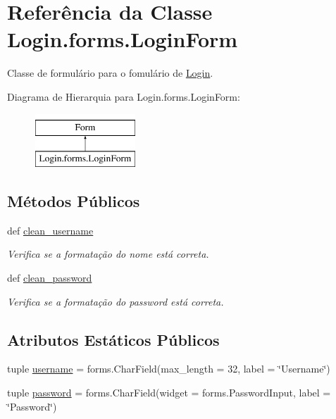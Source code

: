 \hypertarget{classLogin_1_1forms_1_1LoginForm}{\section{Referência da Classe Login.\-forms.\-Login\-Form}
\label{classLogin_1_1forms_1_1LoginForm}
}


Classe de formulário para o fomulário de \hyperlink{namespaceLogin}{Login}.  


Diagrama de Hierarquia para Login.\-forms.\-Login\-Form\-:\begin{figure}[H]
\begin{center}
\leavevmode
\includegraphics[height=2.000000cm]{d0/db9/classLogin_1_1forms_1_1LoginForm}
\end{center}
\end{figure}
\subsection*{Métodos Públicos}
\begin{DoxyCompactItemize}
\item 
def \hyperlink{classLogin_1_1forms_1_1LoginForm_a411400c2fe891080a2ccb332dd0117bf}{clean\-\_\-username}
\begin{DoxyCompactList}\small\item\em Verifica se a formatação do nome está correta. \end{DoxyCompactList}\item 
def \hyperlink{classLogin_1_1forms_1_1LoginForm_a693547dba5ad5addb8f0540711441713}{clean\-\_\-password}
\begin{DoxyCompactList}\small\item\em Verifica se a formatação do password está correta. \end{DoxyCompactList}\end{DoxyCompactItemize}
\subsection*{Atributos Estáticos Públicos}
\begin{DoxyCompactItemize}
\item 
tuple \hyperlink{classLogin_1_1forms_1_1LoginForm_af3766bb4ea8cabdf57ad77214b7545fd}{username} = forms.\-Char\-Field(max\-\_\-length = 32, label = \char`\"{}Username\char`\"{})
\item 
tuple \hyperlink{classLogin_1_1forms_1_1LoginForm_a23e321f790e9c7bfc3e9abf767826a2d}{password} = forms.\-Char\-Field(widget = forms.\-Password\-Input, label = \char`\"{}Password\char`\"{})
\end{DoxyCompactItemize}


